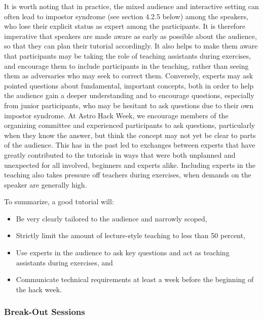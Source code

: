 \documentclass{aastex62}
\begin{document}
It is worth noting that in practice, the mixed audience and interactive setting can often lead to impostor syndrome (see section 4.2.5 below) among the speakers, who lose their explicit status as expert among the participants. It is therefore imperative that speakers are made aware as early as possible about the audience, so that they can plan their tutorial accordingly. It also helps to make them aware that participants may be taking the role of teaching assistants during exercises, and encourage them to include participants in the teaching, rather than seeing them as adversaries who may seek to correct them. Conversely, experts may ask pointed questions about fundamental, important concepts, both in order to help the audience gain a deeper understanding and to encourage questions, especially from junior participants, who may be hesitant to ask questions due to their own impostor syndrome. At Astro Hack Week, we encourage members of the organizing committee and experienced participants to ask questions, particularly when they know the answer, but think the concept may not yet be clear to parts of the audience. This has in the past led to exchanges between experts that have greatly contributed to the tutorials in ways that were both unplanned and unexpected for all involved, beginners and experts alike. Including experts in the teaching also takes pressure off teachers during exercises, when demands on the speaker are generally high.

To summarize, a good tutorial will:
\begin{itemize}
\item Be very clearly tailored to the audience and narrowly scoped,
\item Strictly limit the amount of lecture-style teaching to less than 50 percent,
\item Use experts in the audience to ask key questions and act as teaching assistants during exercises, and
\item Communicate technical requirements at least a week before the beginning of the hack week.
\end{itemize}

\subsubsection{Break-Out Sessions}
\end{document}
